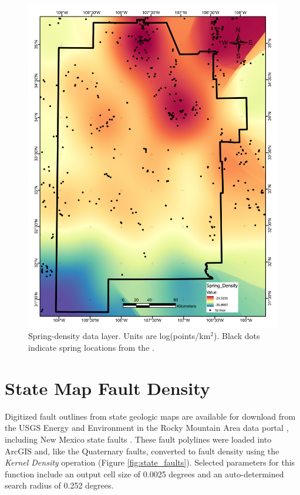 \begin{figure}[H]
\centering
\includegraphics[width=0.75\linewidth]{templates/images/Figure-SpringDensity.pdf}
\caption[Spring density data layer]{Spring-density data layer. Units are log(points/km$^2$). Black dots indicate spring locations from the \protect\citet{usgs_national_2021}.}
\label{fig:feat_spring}
\end{figure}

\section{State Map Fault Density}\label{app:dl_state_fault_density}

Digitized fault outlines from state geologic maps are available for download from the USGS Energy and Environment in the Rocky Mountain Area data portal \citep{usgs_eerma_2021}, including New Mexico state faults \citep{stoeser_usgs_2005}. These fault polylines were loaded into ArcGIS and, like the Quaternary faults, converted to fault density using the \textit{Kernel Density} operation (Figure \ref{fig:state_faults}). Selected parameters for this function include an output cell size of 0.0025 degrees and an auto-determined search radius of 0.252 degrees.

